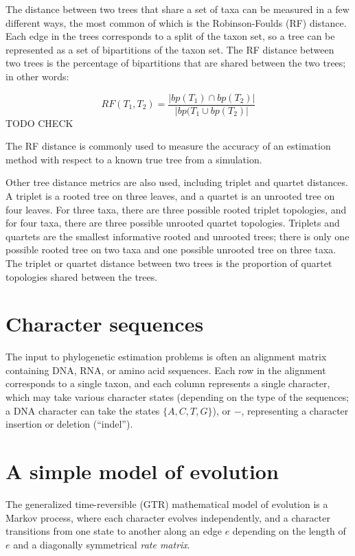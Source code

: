 \documentclass[edeposit,fullpage]{uiucthesis2014}
\theoremstyle{definition}
\begin{document}
The distance between two trees that share a set of taxa can be
measured in a few different ways, the most common of which is the
Robinson-Foulds (RF) distance. Each edge in the trees corresponds to a
split of the taxon set, so a tree can be represented as a set of
bipartitions of the taxon set. The RF distance between two trees is
the percentage of bipartitions that are shared between the two trees;
in other words:

\begin{equation}
  \label{eq:rfdistance}
  RF(T_1, T_2) = \frac{|bp(T_1) \cap bp(T_2)|}{|bp(T_1 \cup bp(T_2)|}
\end{equation}
TODO CHECK

The RF distance is commonly used to measure the accuracy of an
estimation method with respect to a known true tree from a
simulation.

Other tree distance metrics are also used, including triplet and
quartet distances. A triplet is a rooted tree on three leaves, and a
quartet is an unrooted tree on four leaves. For three taxa, there are
three possible rooted triplet topologies, and for four taxa, there are
three possible unrooted quartet topologies. Triplets and quartets are
the smallest informative rooted and unrooted trees; there is only one
possible rooted tree on two taxa and one possible unrooted tree on
three taxa. The triplet or quartet distance between two trees is the
proportion of quartet topologies shared between the trees.

\section{Character sequences}

The input to phylogenetic estimation problems is often an alignment
matrix containing DNA, RNA, or amino acid sequences. Each row in the
alignment corresponds to a single taxon, and each column represents a
single character, which may take various character states (depending
on the type of the sequences; a DNA character can take the states
$\{A,C,T,G\}$), or $-$, representing a character insertion or deletion
(``indel'').

\section{A simple model of evolution}
\label{section:simple-model}


The generalized time-reversible (GTR) mathematical model of evolution
is a Markov process, where each character evolves independently, and a
character transitions from one state to another along an edge $e$
depending on the length of $e$ and a diagonally symmetrical \emph{rate
  matrix}. 
\end{document}
